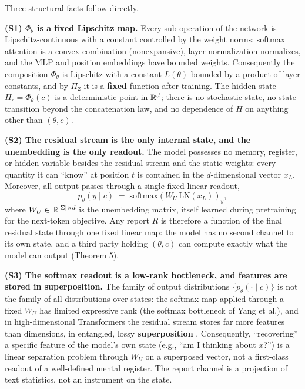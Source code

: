 Three structural facts follow directly.

\textbf{(S1) $\Phi_\theta$ is a fixed Lipschitz map.} Every sub-operation of the network is
Lipschitz-continuous with a constant controlled by the weight norms: softmax attention is a
convex combination (nonexpansive), layer normalization normalizes, and the MLP and position
embeddings have bounded weights. Consequently the composition $\Phi_\theta$ is Lipschitz
with a constant $L(\theta)$ bounded by a product of layer constants, and by $\Pi_2$ it is
a \textbf{fixed} function after training. The hidden state $H_c = \Phi_\theta(c)$ is a
deterministic point in $\mathbb{R}^{d}$; there is no stochastic state, no state transition beyond
the concatenation law, and no dependence of $H$ on anything other than $(\theta, c)$.

\textbf{(S2) The residual stream is the only internal state, and the unembedding is the
only readout.} The model possesses no memory, register, or hidden variable besides the
residual stream and the static weights: every quantity it can ``know'' at position $t$ is
contained in the $d$-dimensional vector $x_{L}$. Moreover, all output passes through a
single fixed linear readout,
\begin{equation}
p_\theta(y \mid c) \;=\; \mathrm{softmax}\!\left( W_{U}\, \mathrm{LN}(x_{L}) \right)_y ,
\label{eq:unembed}
\end{equation}
where $W_{U} \in \mathbb{R}^{\left\lvert \Sigma \right\rvert \times d}$ is the unembedding matrix, itself learned during
pretraining for the next-token objective. Any report $R$ is therefore a function of the final
residual state through one fixed linear map: the model has no second channel to its own
state, and a third party holding $(\theta, c)$ can compute exactly what the model can output
(Theorem 5).

\textbf{(S3) The softmax readout is a low-rank bottleneck, and features are stored in
superposition.} The family of output distributions $\{ p_\theta(\cdot \mid c) \}$ is not the
family of all distributions over states: the softmax map applied through a fixed $W_{U}$
has limited expressive rank (the softmax bottleneck of Yang et
al.\cite{yang-2018-softmax}), and in high-dimensional Transformers the residual stream
stores far more features than dimensions, in entangled, lossy \textbf{superposition}
\cite{elhage-2022-superposition}. Consequently, ``recovering'' a specific feature of the
model's own state (e.g., ``am I thinking about $x$?'') is a linear separation problem through
$W_{U}$ on a superposed vector, not a first-class readout of a well-defined mental
register. The report channel is a projection of text statistics, not an instrument on the
state.

